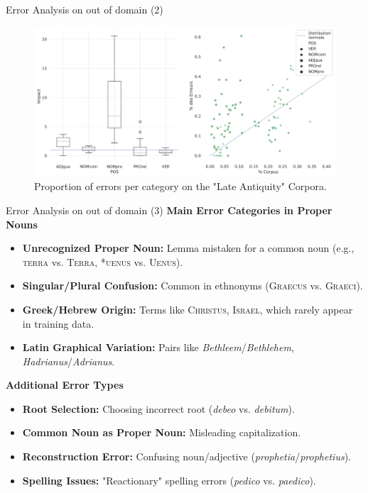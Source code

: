 \documentclass[aspectratio=169]{beamer}
\begin{document}
\begin{frame}{Error Analysis on out of domain (2)}
    \begin{figure}[ht]
        \centering
        \includegraphics[width=.85\linewidth]{images/LatinTardifPosErrorBoxPlot.png}
        \caption{Proportion of errors per category on the "Late Antiquity" Corpora.}
    \end{figure}
\end{frame}

\begin{frame}{Error Analysis on out of domain (3)}
    \textbf{Main Error Categories in Proper Nouns}

    \begin{itemize}
        \item \textbf{Unrecognized Proper Noun:} Lemma mistaken for a common noun 
        (e.g., \textsc{terra} vs. \textsc{Terra}, *\textsc{uenus} vs. \textsc{Uenus}).
        \item \textbf{Singular/Plural Confusion:} Common in ethnonyms (\textsc{Graecus} vs. \textsc{Graeci}).
        \item \textbf{Greek/Hebrew Origin:} Terms like \textsc{Christus}, \textsc{Israel}, which rarely appear in training data.
        \item \textbf{Latin Graphical Variation:} Pairs like \textit{Bethleem}/\textit{Bethlehem}, \textit{Hadrianus}/\textit{Adrianus}.
    \end{itemize}
    \pause
    \textbf{Additional Error Types}
    
    \begin{itemize}
        \item \textbf{Root Selection:} Choosing incorrect root (\textit{debeo} vs. \textit{debitum}).
        \item \textbf{Common Noun as Proper Noun:} Misleading capitalization.
        \item \textbf{Reconstruction Error:} Confusing noun/adjective 
        (\textit{prophetia}/\textit{prophetius}).
        \item \textbf{Spelling Issues:} "Reactionary" spelling errors (\textit{pedico} vs. \textit{paedico}).
    \end{itemize}
    
\end{frame}
\end{document}
